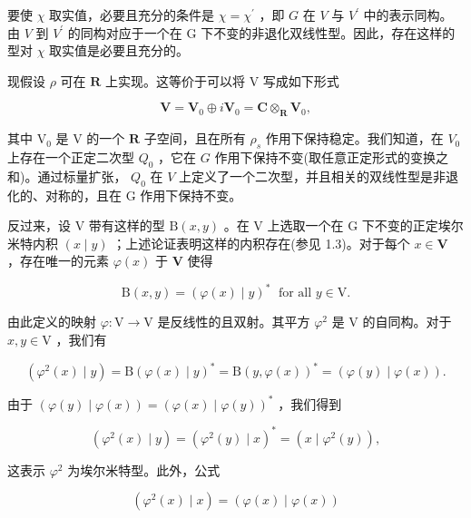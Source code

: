 \documentclass[10pt]{article}
\begin{document}
要使 \(\chi\) 取实值，必要且充分的条件是 \(\chi  = {\chi }^{\prime }\) ，即 \(G\) 在 \(V\) 与 \({V}^{\prime }\) 中的表示同构。由 \(V\) 到 \({V}^{\prime }\) 的同构对应于一个在 G 下不变的非退化双线性型。因此，存在这样的型对 \(\chi\) 取实值是必要且充分的。

现假设 \(\rho\) 可在 \(\mathbf{R}\) 上实现。这等价于可以将 \(\mathrm{V}\) 写成如下形式

\[
\mathbf{V} = {\mathbf{V}}_{0} \oplus  i{\mathbf{V}}_{0} = \mathbf{C}{ \otimes  }_{\mathbf{R}}{\mathbf{V}}_{0},
\]

其中 \({\mathrm{V}}_{0}\) 是 \(\mathrm{V}\) 的一个 \(\mathbf{R}\) 子空间，且在所有 \({\rho }_{s}\) 作用下保持稳定。我们知道，在 \({V}_{0}\) 上存在一个正定二次型 \({Q}_{0}\) ，它在 \(G\) 作用下保持不变(取任意正定形式的变换之和)。通过标量扩张， \({Q}_{0}\) 在 \(V\) 上定义了一个二次型，并且相关的双线性型是非退化的、对称的，且在 G 作用下保持不变。

反过来，设 V 带有这样的型 \(\mathrm{B}\left( {x,y}\right)\) 。在 V 上选取一个在 G 下不变的正定埃尔米特内积 \(\left( {x \mid  y}\right)\) ；上述论证表明这样的内积存在(参见 1.3)。对于每个 \(x \in  \mathbf{V}\) ，存在唯一的元素 \(\varphi \left( x\right)\) 于 \(\mathbf{V}\) 使得

\[
\mathrm{B}\left( {x,y}\right)  = {\left( \varphi \left( x\right)  \mid  y\right) }^{ * }\;\text{ for all }y \in  \mathrm{V}.
\]

由此定义的映射 \(\varphi  : \mathrm{V} \rightarrow  \mathrm{V}\) 是反线性的且双射。其平方 \({\varphi }^{2}\) 是 \(\mathrm{V}\) 的自同构。对于 \(x,y \in  \mathrm{V}\) ，我们有

\[
\left( {{\varphi }^{2}\left( x\right)  \mid  y}\right)  = \mathrm{B}{\left( \varphi \left( x\right)  \mid  y\right) }^{ * } = \mathrm{B}{\left( y,\varphi \left( x\right) \right) }^{ * } = \left( {\varphi \left( y\right)  \mid  \varphi \left( x\right) }\right) .
\]

由于 \(\left( {\varphi \left( y\right)  \mid  \varphi \left( x\right) }\right)  = {\left( \varphi \left( x\right)  \mid  \varphi \left( y\right) \right) }^{ * }\) ，我们得到

\[
\left( {{\varphi }^{2}\left( x\right)  \mid  y}\right)  = {\left( {\varphi }^{2}\left( y\right)  \mid  x\right) }^{ * } = \left( {x \mid  {\varphi }^{2}\left( y\right) }\right) ,
\]

这表示 \({\varphi }^{2}\) 为埃尔米特型。此外，公式

\[
\left( {{\varphi }^{2}\left( x\right)  \mid  x}\right)  = \left( {\varphi \left( x\right)  \mid  \varphi \left( x\right) }\right)
\]
\end{document}

